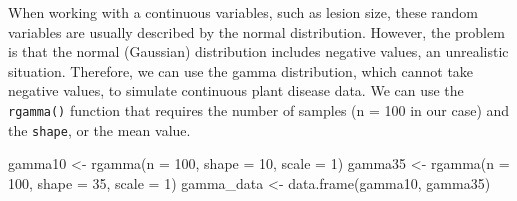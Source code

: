 \documentclass[
  letterpaper,
  DIV=11,
  numbers=noendperiod]{scrreprt}
\newenvironment{Shaded}{\begin{snugshade}}{\end{snugshade}}
\newcommand{\AttributeTok}[1]{\textcolor[rgb]{0.40,0.45,0.13}{#1}}
\newcommand{\DecValTok}[1]{\textcolor[rgb]{0.68,0.00,0.00}{#1}}
\newcommand{\FunctionTok}[1]{\textcolor[rgb]{0.28,0.35,0.67}{#1}}
\newcommand{\NormalTok}[1]{\textcolor[rgb]{0.00,0.23,0.31}{#1}}
\newcommand{\OtherTok}[1]{\textcolor[rgb]{0.00,0.23,0.31}{#1}}
\newcommand{\SpecialCharTok}[1]{\textcolor[rgb]{0.37,0.37,0.37}{#1}}
\newcommand{\StringTok}[1]{\textcolor[rgb]{0.13,0.47,0.30}{#1}}
\begin{document}
When working with a continuous variables, such as lesion size, these
random variables are usually described by the normal distribution.
However, the problem is that the normal (Gaussian) distribution includes
negative values, an unrealistic situation. Therefore, we can use the
gamma distribution, which cannot take negative values, to simulate
continuous plant disease data. We can use the \texttt{rgamma()} function
that requires the number of samples (n = 100 in our case) and the
\texttt{shape}, or the mean value.

\begin{Shaded}
\begin{Highlighting}[]
\NormalTok{gamma10 }\OtherTok{\textless{}{-}} \FunctionTok{rgamma}\NormalTok{(}\AttributeTok{n =} \DecValTok{100}\NormalTok{, }\AttributeTok{shape =} \DecValTok{10}\NormalTok{, }\AttributeTok{scale =} \DecValTok{1}\NormalTok{)}
\NormalTok{gamma35 }\OtherTok{\textless{}{-}} \FunctionTok{rgamma}\NormalTok{(}\AttributeTok{n =} \DecValTok{100}\NormalTok{, }\AttributeTok{shape =} \DecValTok{35}\NormalTok{, }\AttributeTok{scale =} \DecValTok{1}\NormalTok{)}
\NormalTok{gamma\_data }\OtherTok{\textless{}{-}} \FunctionTok{data.frame}\NormalTok{(gamma10, gamma35)}
\end{Highlighting}
\end{Shaded}

\begin{Shaded}
\end{Shaded}
\end{document}
